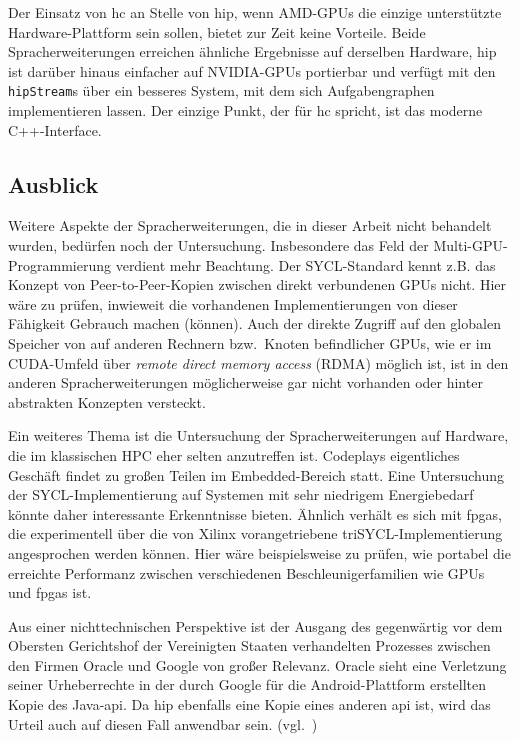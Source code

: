 Der Einsatz von \gls{hc} an Stelle von \gls{hip}, wenn AMD-GPUs die einzige
unterstützte Hardware-Plattform sein sollen, bietet zur Zeit keine Vorteile.
Beide Spracherweiterungen erreichen ähnliche Ergebnisse auf derselben Hardware,
\gls{hip} ist darüber hinaus einfacher auf NVIDIA-GPUs portierbar und verfügt
mit den \texttt{hipStream}s über ein besseres System, mit dem sich
Aufgabengraphen implementieren lassen. Der einzige Punkt, der für \gls{hc}
spricht, ist das moderne C++-Interface.

\subsection{Ausblick}
\label{fazit:ausblick}

Weitere Aspekte der Spracherweiterungen, die in dieser Arbeit nicht behandelt
wurden, bedürfen noch der Untersuchung. Insbesondere das Feld der
Multi-GPU-Programmierung verdient mehr Beachtung. Der SYCL-Standard kennt z.B.
das Konzept von Peer-to-Peer-Kopien zwischen direkt verbundenen GPUs nicht. Hier
wäre zu prüfen, inwieweit die vorhandenen Implementierungen von dieser Fähigkeit
Gebrauch machen (können). Auch der direkte Zugriff auf den globalen Speicher
von auf anderen Rechnern bzw.\ Knoten befindlicher GPUs, wie er im CUDA-Umfeld
über \textit{remote direct memory access} (RDMA) möglich ist, ist in den anderen
Spracherweiterungen möglicherweise gar nicht vorhanden oder hinter abstrakten
Konzepten versteckt.

Ein weiteres Thema ist die Untersuchung der Spracherweiterungen auf Hardware,
die im klassischen HPC eher selten anzutreffen ist. Codeplays eigentliches
Geschäft findet zu großen Teilen im Embedded-Bereich statt. Eine Untersuchung
der SYCL-Implementierung auf Systemen mit sehr niedrigem Energiebedarf könnte
daher interessante Erkenntnisse bieten. Ähnlich verhält es sich mit \gls{fpga}s,
die experimentell über die von Xilinx vorangetriebene triSYCL-Implementierung
angesprochen werden können. Hier wäre beispielsweise zu prüfen, wie portabel
die erreichte Performanz zwischen verschiedenen Beschleunigerfamilien wie
GPUs und \gls{fpga}s ist.

Aus einer nichttechnischen Perspektive ist der Ausgang des gegenwärtig vor
dem Obersten Gerichtshof der Vereinigten Staaten verhandelten Prozesses zwischen
den Firmen Oracle und Google von großer Relevanz. Oracle sieht eine Verletzung
seiner Urheberrechte in der durch Google für die Android-Plattform erstellten
Kopie des Java-\gls{api}. Da \gls{hip} ebenfalls eine Kopie eines anderen
\gls{api} ist, wird das Urteil auch auf diesen Fall anwendbar sein.
(vgl.~\cite{golem2019})
